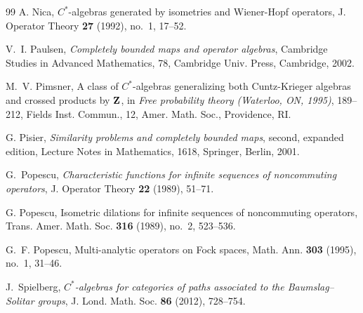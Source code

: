 \documentclass[12pt]{amsart}
\theoremstyle{definition}
\theoremstyle{remark}
\numberwithin{equation}{section}
\begin{document}
\begin{thebibliography}{99}
A. Nica, $C^*$-algebras generated by isometries and Wiener-Hopf operators, J. Operator Theory {\bf 27} (1992), no.~1, 17--52.


V.~I. Paulsen, {\it Completely bounded maps and operator algebras}, Cambridge Studies in Advanced Mathematics, 78, Cambridge Univ. Press, Cambridge, 2002.


M.~V. Pimsner, A class of $C^*$-algebras generalizing both Cuntz-Krieger algebras and crossed products by ${\bf Z}$, in {\it Free probability theory (Waterloo, ON, 1995)}, 189--212, Fields Inst. Commun., 12, Amer. Math. Soc., Providence, RI.


G. Pisier, {\it Similarity problems and completely bounded maps}, second, expanded edition, Lecture Notes in Mathematics, 1618, Springer, Berlin, 2001.

G.~Popescu,
\textit{Characteristic functions for infinite sequences of noncommuting operators},
J. Operator Theory \textbf{22} (1989), 51--71.

G. Popescu, Isometric dilations for infinite sequences of noncommuting operators, Trans. Amer. Math. Soc. {\bf 316} (1989), no.~2, 523--536.



G.~F. Popescu, Multi-analytic operators on Fock spaces, Math. Ann. {\bf 303} (1995), no.~1, 31--46.


J.~Spielberg, \textit{$C^*$-algebras for categories of paths associated to the Baumslag--Solitar groups}, J. Lond. Math. Soc. \textbf{86} (2012), 728--754.


\end{thebibliography}
\end{document}
